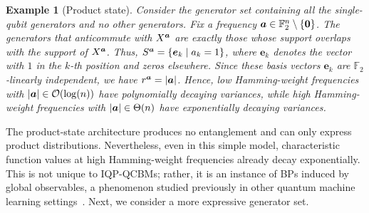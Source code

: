 \documentclass{article}
\theoremstyle{plain}
\newtheorem{example}[theorem]{Example}
\theoremstyle{definition}
\theoremstyle{remark}
\begin{document}
\begin{example}[Product state]
\label{eg:product}
Consider the generator set containing all the single-qubit generators and no other generators. Fix a frequency ${\bm{a}} \in \mathbb{F}_2^n \setminus \{\bm{0}\}$. The generators that anticommute with $X^{\bm{a}}$ are exactly those whose support overlaps with the support of $X^{\bm{a}}$. Thus, $S^{\bm{a}}=\{\bm{e}_k \mid a_k=1\}$, where $\bm{e}_k$ denotes the vector with $1$ in the $k$-th position and zeros elsewhere. Since these basis vectors $\bm{e}_k$ are $\mathbb{F}_2$-linearly independent, we have $r^{\bm{a}} = \abs{{\bm{a}}}$. Hence, low Hamming-weight frequencies with $\abs{{\bm{a}}} \in \mathcal{O}(\log(n))$ have polynomially decaying variances, while high Hamming-weight frequencies with $\abs{{\bm{a}}} \in \Theta(n)$ have exponentially decaying variances.
\end{example}

The product-state architecture produces no entanglement and can only express product distributions. Nevertheless, even in this simple model, characteristic function values at high Hamming-weight frequencies already decay exponentially. This is not unique to IQP-QCBMs; rather, it is an instance of BPs induced by global observables, a phenomenon studied previously in other quantum machine learning settings~\citet{Cerezo21,rudolph24}. Next, we consider a more expressive generator set.
\end{document}
